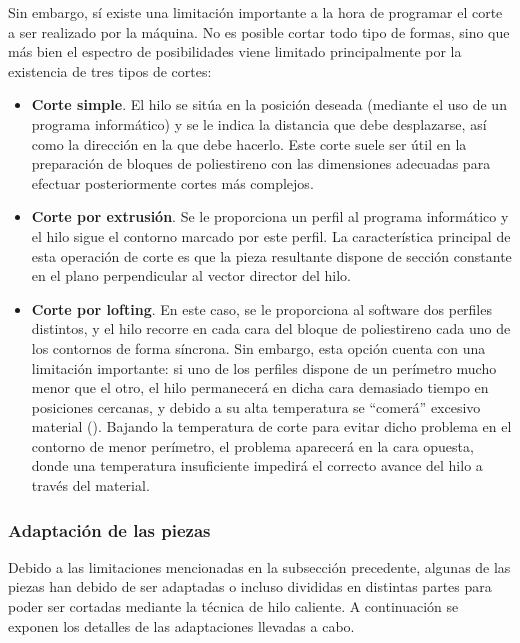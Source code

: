 Sin embargo, sí existe una limitación importante a la hora de programar el corte a ser realizado por la máquina. No es posible cortar todo tipo de formas, sino que más bien el espectro de posibilidades viene limitado principalmente por la existencia de tres tipos de cortes:
\begin{itemize}
\item \textbf{Corte simple}. El hilo se sitúa en la posición deseada (mediante el uso de un programa informático) y se le indica la distancia que debe desplazarse, así como la dirección en la que debe hacerlo. Este corte suele ser útil en la preparación de bloques de poliestireno con las dimensiones adecuadas para efectuar posteriormente cortes más complejos.
\item \textbf{Corte por extrusión}. Se le proporciona un perfil al programa informático y el hilo sigue el contorno marcado por este perfil. La característica principal de esta operación de corte es que la pieza resultante dispone de sección constante en el plano perpendicular al vector director del hilo.
\item \textbf{Corte por lofting}. En este caso, se le proporciona al software dos perfiles distintos, y el hilo recorre en cada cara del bloque de poliestireno cada uno de los contornos de forma síncrona. Sin embargo, esta opción cuenta con una limitación importante: si uno de los perfiles dispone de un perímetro mucho menor que el otro, el hilo permanecerá en dicha cara demasiado tiempo en posiciones cercanas, y debido a su alta temperatura se “comerá” excesivo material (). Bajando la temperatura de corte para evitar dicho problema en el contorno de menor perímetro, el problema aparecerá en la cara opuesta, donde una temperatura insuficiente impedirá el correcto avance del hilo a través del material.
\end{itemize}


\subsubsection{Adaptación de las piezas}
\label{sec:building:technique:adaptation}

Debido a las limitaciones mencionadas en la subsección precedente, algunas de las piezas han debido de ser adaptadas o incluso divididas en distintas partes para poder ser cortadas mediante la técnica de hilo caliente. A continuación se exponen los detalles de las adaptaciones llevadas a cabo.

